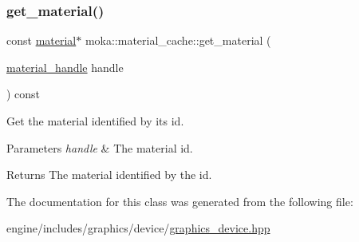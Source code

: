 \subsubsection{\texorpdfstring{get\_material()}{get\_material()}\hspace{0.1cm}{\footnotesize\ttfamily [2/2]}}
{\footnotesize\ttfamily const \mbox{\hyperlink{classmoka_1_1material}{material}}$\ast$ moka\+::material\+\_\+cache\+::get\+\_\+material (\begin{DoxyParamCaption}\item[{\mbox{\hyperlink{structmoka_1_1material__handle}{material\+\_\+handle}}}]{handle }\end{DoxyParamCaption}) const}



Get the material identified by its id. 


\begin{DoxyParams}{Parameters}
{\em handle} & The material id. \\
\hline
\end{DoxyParams}
\begin{DoxyReturn}{Returns}
The material identified by the id. 
\end{DoxyReturn}


The documentation for this class was generated from the following file\+:\begin{DoxyCompactItemize}
\item 
engine/includes/graphics/device/\mbox{\hyperlink{graphics__device_8hpp}{graphics\+\_\+device.\+hpp}}\end{DoxyCompactItemize}
